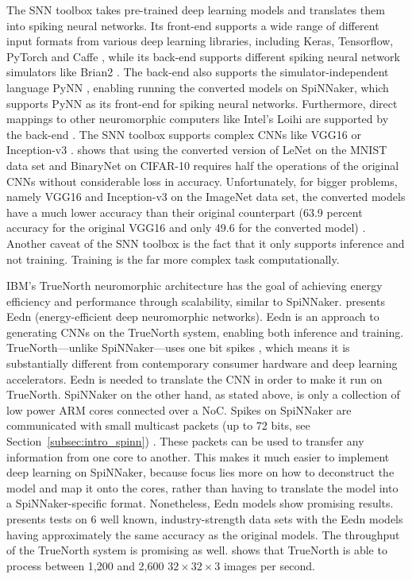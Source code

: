 \documentclass[]{article}
\begin{document}
The SNN toolbox takes pre-trained deep learning models and translates
them into spiking neural networks.
Its front-end supports a wide range of different input formats from
various deep learning libraries, including Keras, Tensorflow, PyTorch
and Caffe \citep{jia_et_al_2014}, while its back-end supports
different spiking neural network simulators like Brian2
\citep{stimberg_et_al_2019}.
The back-end also supports the simulator-independent language PyNN
\citep{davison_et_al_2009}, enabling running the converted models
on SpiNNaker, which supports PyNN as its front-end for spiking neural
networks.
Furthermore, direct mappings to other neuromorphic
computers like Intel's Loihi \citep{davies_et_al_2018} are supported
by the back-end \citep{snn_toolbox_2020}.
The SNN toolbox supports complex CNNs like VGG16 or Inception-v3
\citep{szegedy_et_al_2015, rueckauer_et_al_2017}.
\citet{rueckauer_et_al_2017} shows that using the converted version of
LeNet \citep{lecun_et_al_1989} on the MNIST data set
\citep{lecun_et_al_2020} and BinaryNet \citep{courbariaux_et_al_2016}
on CIFAR-10 \citep{krizhevsky_2009} requires half the
operations of the original CNNs without considerable loss in
accuracy.
Unfortunately, for bigger problems, namely VGG16 and Inception-v3 on
the ImageNet data set, the converted models have a much lower accuracy
than their original counterpart (63.9 percent accuracy for the
original VGG16 and only 49.6 for the converted model)
\citep{rueckauer_et_al_2017}.
Another caveat of the SNN toolbox is the fact that it only supports
inference and not training.
Training is the far more complex task computationally.

IBM's TrueNorth neuromorphic architecture has the goal of
achieving energy efficiency and performance through scalability,
similar to SpiNNaker.
\citet{esser_et_al_2016} presents Eedn (energy-efficient deep
neuromorphic networks).
Eedn is an approach to generating CNNs on the TrueNorth system,
enabling both inference and training.
TrueNorth---unlike SpiNNaker---uses one bit spikes
\citep{esser_et_al_2016}, which means it is substantially different
from contemporary consumer hardware and deep learning accelerators.
Eedn is needed to translate the CNN in order to make it run on
TrueNorth.
SpiNNaker on the other hand, as stated above, is only a collection
of low power ARM cores connected over a NoC.
Spikes on SpiNNaker are communicated with small multicast packets
(up to 72 bits, see Section~\ref{subsec:intro_spinn})
\citep{furber_et_al_2020}.
These packets can be used to transfer any information from one core
to another.
This makes it much easier to implement deep learning on SpiNNaker,
because focus lies more on how to deconstruct the model and map it
onto the cores, rather than having to translate the model into a
SpiNNaker-specific format.
Nonetheless, Eedn models show promising results.
\citet{esser_et_al_2016} presents tests on 6 well known,
industry-strength data sets with the Eedn models having approximately
the same accuracy as the original models.
The throughput of the TrueNorth system is promising as well.
\citet{esser_et_al_2016} shows that TrueNorth is able to process
between 1,200 and 2,600 $32\times32\times3$ images per second.
\end{document}

